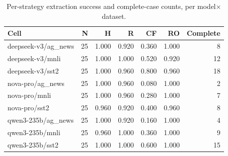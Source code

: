 \begin{table}[t]
\centering
\caption{Per-strategy extraction success and complete-case counts, per model$\times$dataset.}
\label{tab:coverage}
\begin{tabular}{lrrrrrr}
\toprule
Cell & N & H & R & CF & RO & Complete \\
\midrule
deepseek-v3/ag_news & 25 & 1.000 & 0.920 & 0.360 & 1.000 & 8 \\
deepseek-v3/mnli & 25 & 1.000 & 1.000 & 0.520 & 0.920 & 12 \\
deepseek-v3/sst2 & 25 & 1.000 & 0.960 & 0.800 & 0.960 & 18 \\
nova-pro/ag_news & 25 & 1.000 & 0.960 & 0.080 & 1.000 & 2 \\
nova-pro/mnli & 25 & 1.000 & 0.960 & 0.280 & 1.000 & 7 \\
nova-pro/sst2 & 25 & 0.960 & 0.920 & 0.400 & 0.960 & 8 \\
qwen3-235b/ag_news & 25 & 1.000 & 0.920 & 0.160 & 1.000 & 4 \\
qwen3-235b/mnli & 25 & 0.960 & 1.000 & 0.360 & 1.000 & 9 \\
qwen3-235b/sst2 & 25 & 1.000 & 1.000 & 0.600 & 1.000 & 15 \\
\bottomrule
\end{tabular}
\end{table}
